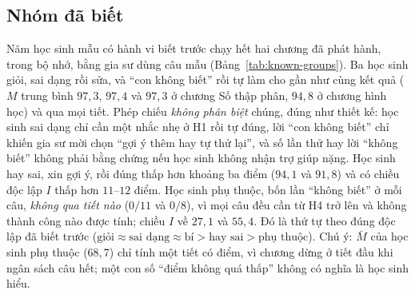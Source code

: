 \begin{table}[tp]
\centering
\caption{Một học sinh dựng sẵn đi qua các cổng, từng bước thêm bằng chứng (chương mẫu). ``Qua'': luật qua tiết đã thỏa.}
\label{tab:staircase}

\end{table}

\subsection{Nhóm đã biết}\label{sec:known-groups}
Năm học sinh mẫu có hành vi biết trước chạy hết hai chương đã phát hành, trong bộ nhớ, bằng gia sư dùng câu mẫu (Bảng~\ref{tab:known-groups}). Ba học sinh giỏi, sai dạng rồi sửa, và ``con không biết'' rồi tự làm cho gần như cùng kết quả ($M$ trung bình $97{,}3$, $97{,}4$ và $97{,}3$ ở chương Số thập phân, $94{,}8$ ở chương hình học) và qua mọi tiết. Phép chiếu \emph{không phân biệt} chúng, đúng như thiết kế: học sinh sai dạng chỉ cần một nhắc nhẹ ở H1 rồi tự đúng, lời ``con không biết'' chỉ khiến gia sư mời chọn ``gợi ý thêm hay tự thử lại'', và số lần thử hay lời ``không biết'' không phải bằng chứng nếu học sinh không nhận trợ giúp nặng. Học sinh hay sai, xin gợi ý, rồi đúng thấp hơn khoảng ba điểm ($94{,}1$ và $91{,}8$) và có chiều độc lập $I$ thấp hơn $11$--$12$ điểm. Học sinh phụ thuộc, bốn lần ``không biết'' ở mỗi câu, \emph{không qua tiết nào} ($0/11$ và $0/8$), vì mọi câu đều cần từ H4 trở lên và không thành công nào được tính; chiều $I$ về $27{,}1$ và $55{,}4$. Đó là thứ tự theo đúng độc lập đã biết trước ($\text{giỏi}\approx\text{sai dạng}\approx\text{bí}>\text{hay sai}>\text{phụ thuộc}$). Chú ý: $\bar M$ của học sinh phụ thuộc ($68{,}7$) chỉ tính một tiết có điểm, vì chương dừng ở tiết đầu khi ngân sách câu hết; một con số ``điểm không quá thấp'' không có nghĩa là học sinh hiểu.

\begin{table}[tp]
\centering
\caption{Năm học sinh mẫu học hết hai chương đã phát hành, trong bộ nhớ, không gọi mô hình. ``Qua'': số tiết qua; ``Gợi ý'': số gợi ý đã nhận; $\bar M$ trung bình điểm các tiết có điểm (số tiết trong ngoặc); $\bar I$: trung bình chiều độc lập.}
\label{tab:known-groups}

\end{table}

